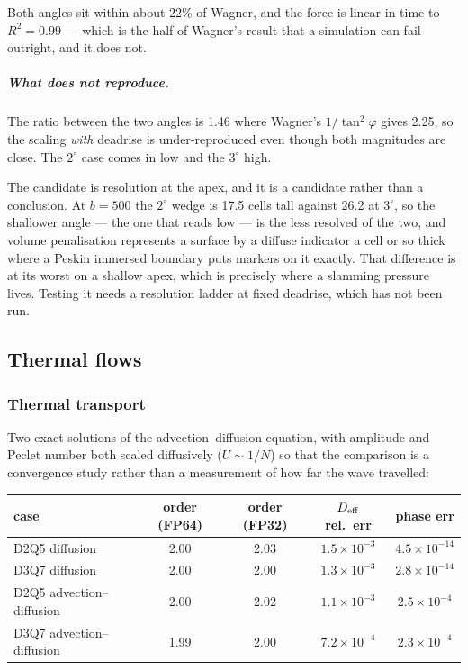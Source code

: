 \documentclass[11pt,a4paper]{article}
\begin{document}
Both angles sit within about 22\% of Wagner, and the force is linear in time to
$R^2=0.99$ --- which is the half of Wagner's result that a simulation can fail
outright, and it does not.

\subparagraph{What does not reproduce.} The ratio between the two angles is
1.46 where Wagner's $1/\tan^2\varphi$ gives 2.25, so the scaling \emph{with}
deadrise is under-reproduced even though both magnitudes are close. The
$2^\circ$ case comes in low and the $3^\circ$ high.

The candidate is resolution at the apex, and it is a candidate rather than a
conclusion. At $b=500$ the $2^\circ$ wedge is 17.5 cells tall against 26.2 at
$3^\circ$, so the shallower angle --- the one that reads low --- is the less
resolved of the two, and volume penalisation represents a surface by a diffuse
indicator a cell or so thick where a Peskin immersed boundary puts markers on
it exactly. That difference is at its worst on a shallow apex, which is
precisely where a slamming pressure lives. Testing it needs a resolution ladder
at fixed deadrise, which has not been run.

\subsection{Thermal flows}
\label{sec:val:thermal}
\subsubsection{Thermal transport}

Two exact solutions of the advection--diffusion equation, with amplitude and
Peclet number both scaled diffusively ($U\sim1/N$) so that the comparison is a
convergence study rather than a measurement of how far the wave travelled:

\begin{center}\small
\begin{tabular}{lcccc}
\toprule
case & order (FP64) & order (FP32) & $D_{\rm eff}$ rel.\ err & phase err \\
\midrule
D2Q5 diffusion            & 2.00 & 2.03 & $1.5\times10^{-3}$ & $4.5\times10^{-14}$ \\
D3Q7 diffusion            & 2.00 & 2.00 & $1.3\times10^{-3}$ & $2.8\times10^{-14}$ \\
D2Q5 advection--diffusion & 2.00 & 2.02 & $1.1\times10^{-3}$ & $2.5\times10^{-4}$ \\
D3Q7 advection--diffusion & 1.99 & 2.00 & $7.2\times10^{-4}$ & $2.3\times10^{-4}$ \\
\bottomrule
\end{tabular}
\end{center}
\end{document}
